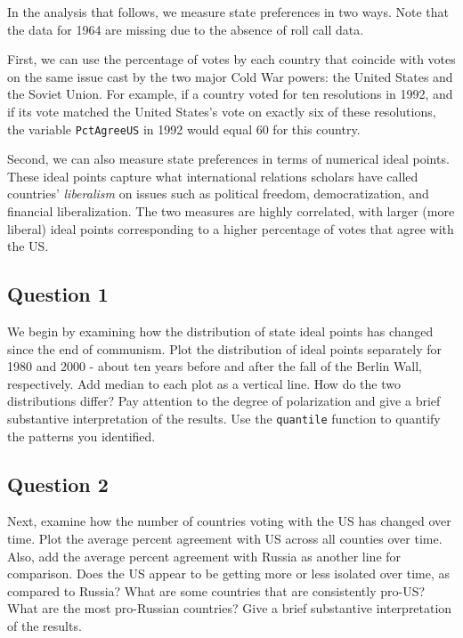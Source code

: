 \documentclass[]{article}
\begin{document}
In the analysis that follows, we measure state preferences in two ways.
Note that the data for 1964 are missing due to the absence of roll call
data.

First, we can use the percentage of votes by each country that coincide
with votes on the same issue cast by the two major Cold War powers: the
United States and the Soviet Union. For example, if a country voted for
ten resolutions in 1992, and if its vote matched the United States's
vote on exactly six of these resolutions, the variable
\texttt{PctAgreeUS} in 1992 would equal 60 for this country.

Second, we can also measure state preferences in terms of numerical
ideal points.\\These ideal points capture what international relations
scholars have called countries' \emph{liberalism} on issues such as
political freedom, democratization, and financial liberalization. The
two measures are highly correlated, with larger (more liberal) ideal
points corresponding to a higher percentage of votes that agree with the
US.

\subsection{Question 1}\label{question-1}

We begin by examining how the distribution of state ideal points has
changed since the end of communism. Plot the distribution of ideal
points separately for 1980 and 2000 - about ten years before and after
the fall of the Berlin Wall, respectively. Add median to each plot as a
vertical line. How do the two distributions differ? Pay attention to the
degree of polarization and give a brief substantive interpretation of
the results. Use the \texttt{quantile} function to quantify the patterns
you identified.

\subsection{Question 2}\label{question-2}

Next, examine how the number of countries voting with the US has changed
over time. Plot the average percent agreement with US across all
counties over time. Also, add the average percent agreement with Russia
as another line for comparison. Does the US appear to be getting more or
less isolated over time, as compared to Russia? What are some countries
that are consistently pro-US? What are the most pro-Russian countries?
Give a brief substantive interpretation of the results.
\end{document}
